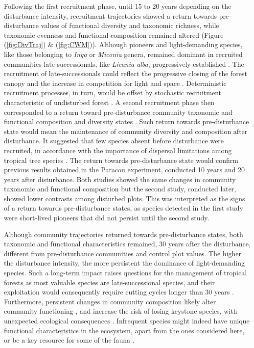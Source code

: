 \documentclass[fleqn,10pt]{ArtEcoFoG} %
\begin{document}
Following the first recruitment phase, until 15 to 20 years depending on the disturbance intensity, recruitment trajectories showed a return towards pre-disturbance values of functional diversity and taxonomic richness, while taxonomic evenness and functional composition remained altered (Figure (\ref{fig:DivTraj}) \& (\ref{fig:CWM})).
Although pioneers and light-demanding species, like those belonging to \emph{Inga} or \emph{Miconia} genera, remained dominant in recruited communities late-successionals, like \emph{Licania alba}, progressively established \citep{Fortunel2014}.
The recruitment of late-successionals could reflect the progressive closing of the forest canopy and the increase in competition for light and space \citep{Peet1992, Denslow2000}. Deterministic recruitment processes, in turn, would be offset by stochastic recruitment characteristic of undisturbed forest \citep{Lawton1988, Chave2004}.
A second recruitment phase then corresponded to a return toward pre-disturbance community taxonomic and functional composition and diversity states \citep{Fukami2005, Fortunel2014}.
Such return towards pre-disturbance state would mean the maintenance of community diversity and composition after disturbance. It suggested that few species absent before disturbance were recruited, in accordance with the importance of dispersal limitations among tropical tree species \citep{Svenning2005}.
The return towards pre-disturbance state would confirm previous results obtained in the Paracou experiment, conducted 10 years \citep{Molino2001} and 20 years \citep{Baraloto2012a} after disturbance.
Both studies showed the same changes in community taxonomic and functional composition but the second study, conducted later, showed lower contrasts among disturbed plots. This was interpreted as the signs of a return towards pre-disturbance states, as species detected in the first study were short-lived pioneers that did not persist until the second study.

Although community trajectories returned towards pre-disturbance states, both taxonomic and functional characteristics remained, 30 years after the disturbance, different from pre-disturbance communities and control plot values.
The higher the disturbance intensity, the more persistent the dominance of light-demanding species. Such a long-term impact raises questions for the management of tropical forests as most valuable species are late-successional species, and their exploitation would consequently require cutting cycles longer than 30 years \citep{Putz2012}.
Furthermore, persistent changes in community composition likely alter community functioning \citep{Diaz2005}, and increase the risk of losing keystone species, with unexpected ecological consequences \citep{Jones1994, Chazdon2003a}.
Infrequent species might indeed have unique functional characteristics in the ecosystem, apart from the ones considered here, or be a key resource for some of the fauna \citep{Schleuning2016}.
\end{document}
